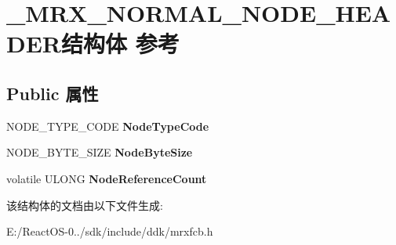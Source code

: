 \hypertarget{struct___m_r_x___n_o_r_m_a_l___n_o_d_e___h_e_a_d_e_r}{}\section{\+\_\+\+M\+R\+X\+\_\+\+N\+O\+R\+M\+A\+L\+\_\+\+N\+O\+D\+E\+\_\+\+H\+E\+A\+D\+E\+R结构体 参考}
\label{struct___m_r_x___n_o_r_m_a_l___n_o_d_e___h_e_a_d_e_r}
\subsection*{Public 属性}
\begin{DoxyCompactItemize}
\item 
\mbox{\label{struct___m_r_x___n_o_r_m_a_l___n_o_d_e___h_e_a_d_e_r_a1c7f9c06dac37abb9f26b4c753c652b7}} 
N\+O\+D\+E\+\_\+\+T\+Y\+P\+E\+\_\+\+C\+O\+DE {\bfseries Node\+Type\+Code}
\item 
\mbox{\label{struct___m_r_x___n_o_r_m_a_l___n_o_d_e___h_e_a_d_e_r_a0583c753da997415d3193e514be1e690}} 
N\+O\+D\+E\+\_\+\+B\+Y\+T\+E\+\_\+\+S\+I\+ZE {\bfseries Node\+Byte\+Size}
\item 
\mbox{\label{struct___m_r_x___n_o_r_m_a_l___n_o_d_e___h_e_a_d_e_r_aa9ac474cddb09ab7b98452dd2cc2b96f}} 
volatile U\+L\+O\+NG {\bfseries Node\+Reference\+Count}
\end{DoxyCompactItemize}


该结构体的文档由以下文件生成\+:\begin{DoxyCompactItemize}
\item 
E\+:/\+React\+O\+S-\/0../sdk/include/ddk/mrxfcb.\+h\end{DoxyCompactItemize}

